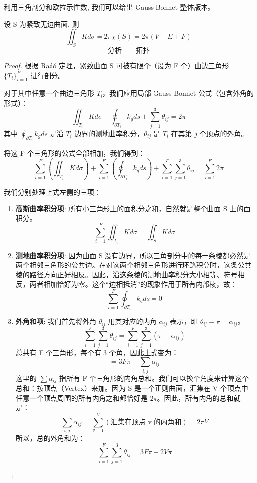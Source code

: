 \documentclass[lang=cn,10pt,thmcnt=section]{elegantbook}
\begin{document}
利用三角剖分和欧拉示性数, 我们可以给出 Gauss-Bonnet 整体版本。
\begin{theorem}
    设 S 为紧致无边曲面, 则
$$ \iint_S K d\sigma = 2\pi\chi(S) = 2\pi(V-E+F) $$
$$ \text{分析} \qquad \text{拓扑} $$
\end{theorem}
\begin{proof}


根据 Radó 定理，紧致曲面 S 可被有限个（设为 F 个）曲边三角形 $\{T_i\}_{i=1}^F$ 进行剖分。

对于其中任意一个曲边三角形 $T_i$，我们应用局部 Gauss-Bonnet 公式（包含外角的形式）：
$$\iint_{T_i} K d\sigma + \oint_{\partial T_i} k_g ds + \sum_{j=1}^{3} \theta_{ij} = 2\pi$$
其中 $\oint_{\partial T_i} k_g ds$ 是沿 $T_i$ 边界的测地曲率积分，$\theta_{ij}$ 是 $T_i$ 在其第 $j$ 个顶点的外角。

将这 F 个三角形的公式全部相加，我们得到：
$$\sum_{i=1}^{F} \left( \iint_{T_i} K d\sigma \right) + \sum_{i=1}^{F} \left( \oint_{\partial T_i} k_g ds \right) + \sum_{i=1}^{F} \sum_{j=1}^{3} \theta_{ij} = \sum_{i=1}^{F} 2\pi$$



我们分别处理上式左侧的三项：
\begin{enumerate}
    \item \textbf{高斯曲率积分项}: 所有小三角形上的面积分之和，自然就是整个曲面 S 上的面积分。
    $$\sum_{i=1}^{F} \iint_{T_i} K d\sigma = \iint_S K d\sigma$$
    \item \textbf{测地曲率积分项}: 因为曲面 S 没有边界，所以三角剖分中的每一条棱都必然是两个相邻三角形的公共边。在对这两个相邻三角形进行环路积分时，这条公共棱的路径方向正好相反。因此，沿这条棱的测地曲率积分大小相等、符号相反，两者相加恰好为零。这个“边相抵消”的现象作用于所有内部棱，故：
    $$\sum_{i=1}^{F} \oint_{\partial T_i} k_g ds = 0$$
    \item \textbf{外角和项}: 我们首先将外角 $\theta_{ij}$ 用其对应的内角 $\alpha_{ij}$ 表示，即 $\theta_{ij} = \pi - \alpha_{ij}$。
    $$\sum_{i=1}^{F} \sum_{j=1}^{3} \theta_{ij} = \sum_{i=1}^{F} \sum_{j=1}^{3} (\pi - \alpha_{ij})$$
    总共有 F 个三角形，每个有 3 个角，因此上式变为：
    $$= 3F\pi - \sum_{i,j} \alpha_{ij}$$
    这里的 $\sum \alpha_{ij}$ 指所有 F 个三角形的内角总和。我们可以换个角度来计算这个总和：按顶点（Vertex）来加。因为 S 是一个正则曲面，汇集在 V 个顶点中任意一个顶点周围的所有内角之和都恰好是 $2\pi$。因此，所有内角的总和就是：
    $$\sum_{i,j} \alpha_{ij} = \sum_{v=1}^{V} (\text{汇集在顶点 v 的内角和}) = 2\pi V$$
    所以，总的外角和为：
    $$\sum_{i=1}^{F} \sum_{j=1}^{3} \theta_{ij} = 3F\pi - 2V\pi$$
\end{enumerate}



\end{proof}
\end{document}
